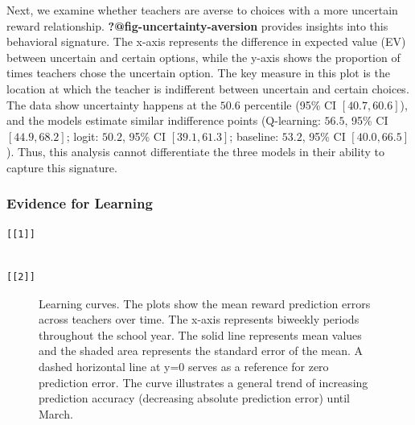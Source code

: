 \documentclass[
  number,
  preprint,
  3p,
  onecolumn]{elsarticle}
\begin{document}
Next, we examine whether teachers are averse to choices with a more
uncertain reward relationship. \textbf{?@fig-uncertainty-aversion}
provides insights into this behavioral signature. The x-axis represents
the difference in expected value (EV) between uncertain and certain
options, while the y-axis shows the proportion of times teachers chose
the uncertain option. The key measure in this plot is the location at
which the teacher is indifferent between uncertain and certain choices.
The data show uncertainty happens at the \(50.6\) percentile (95\% CI
\([40.7,60.6]\)), and the models estimate similar indifference points
(Q-learning: \(56.5\), 95\% CI \([44.9, 68.2]\); logit: \(50.2\), 95\%
CI \([39.1, 61.3]\); baseline: \(53.2\), 95\% CI \([40.0, 66.5]\)).
Thus, this analysis cannot differentiate the three models in their
ability to capture this signature.

\subsubsection{Evidence for Learning}\label{evidence-for-learning}

\begin{verbatim}
[[1]]
\end{verbatim}

\begin{verbatim}

[[2]]
\end{verbatim}

\begin{figure}


\caption{\label{fig-prediction-errors-1}Learning curves. The plots show
the mean reward prediction errors across teachers over time. The x-axis
represents biweekly periods throughout the school year. The solid line
represents mean values and the shaded area represents the standard error
of the mean. A dashed horizontal line at y=0 serves as a reference for
zero prediction error. The curve illustrates a general trend of
increasing prediction accuracy (decreasing absolute prediction error)
until March.}

\end{figure}%
\end{document}
